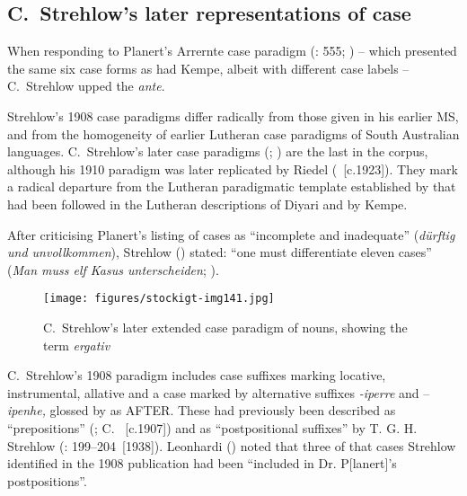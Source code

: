 \subsection{C.~Strehlow’s later representations of case}
\label{sec:key:9.3.4}

When responding to Planert’s Arrernte case paradigm (\citeyear{planert_australische_1907}: 555; ) -- which presented the same six case forms as had Kempe, albeit with different case labels -- C.~Strehlow upped the \textit{ante}.

Strehlow’s 1908 case paradigms differ radically from those given in his earlier MS, and from the homogeneity of earlier Lutheran case paradigms of South Australian languages. C.~Strehlow’s later case paradigms (\citeyear{strehlow_einige_1908}; \citeyear{strehlow_notitle_1910}) are the last in the corpus, although his 1910 paradigm was later replicated by Riedel (\citeyear{riedel_notitle_1931}~[c.1923]). They mark a radical departure from the Lutheran paradigmatic template established by \citet{teichelmann_outlines_1840} that had been followed in the Lutheran descriptions of Diyari and by Kempe.

After criticising Planert’s listing of cases as “incomplete and inadequate” (\textit{dürf\-tig und unvollkommen}), Strehlow (\citeyear[699]{strehlow_einige_1908}) stated: “one must differentiate eleven cases” (\textit{Man muss elf Kasus unterscheiden}; ).


\begin{figure}
\texttt{[image: figures/stockigt-img141.jpg]}
\caption{C.~Strehlow’s later extended case paradigm of nouns, showing the term \textit{ergativ} \citeyearpar[699--700]{strehlow_einige_1908}}
\label{bkm:Ref456021393}
\label{fig:key:195}
\end{figure}

C.~Strehlow’s 1908 paradigm includes case suffixes marking locative, instrumental, allative and a case marked by alternative suffixes \textit{-iperre} and –\textit{ipenhe,} glossed by \citet[210]{wilkins_mparntwe_1989} as AFTER. These had previously been described as “prepositions” (\citealt{kempe_grammar_1891}; C. \citealt{strehlow_untitled_1931}~[c.1907]) and as “postpositional suffixes” by T. G. H. Strehlow (\citeyear{strehlow_aranda_1944}: 199--204~[1938]). Leonhardi (\citeyear{leonhardi_letter_1909}) noted that three of that cases Strehlow identified in the 1908 publication had been “included in Dr. P[lanert]’s postpositions”.

